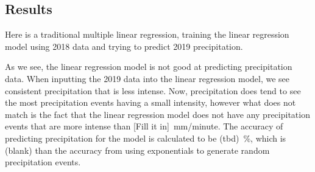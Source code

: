 \documentclass[11pt]{report}
\begin{document}

\subsection{Results}

Here is a traditional multiple linear regression, training the linear
regression model using 2018 data and trying to predict 2019 precipitation.

As we see, the linear regression model is not good at predicting precipitation data. When inputting the 2019 data into the linear regression model, we see consistent precipitation that is less intense. Now, precipitation does tend to see the most precipitation events having a small intensity, however what does not match is the fact that the linear regression model does not have any precipitation events that are more intense than [Fill it in]~mm/minute. The accuracy of predicting precipitation for the model is calculated to be (tbd)~\%, which is (blank) than the accuracy from using exponentials to generate random precipitation events. 
\end{document}
